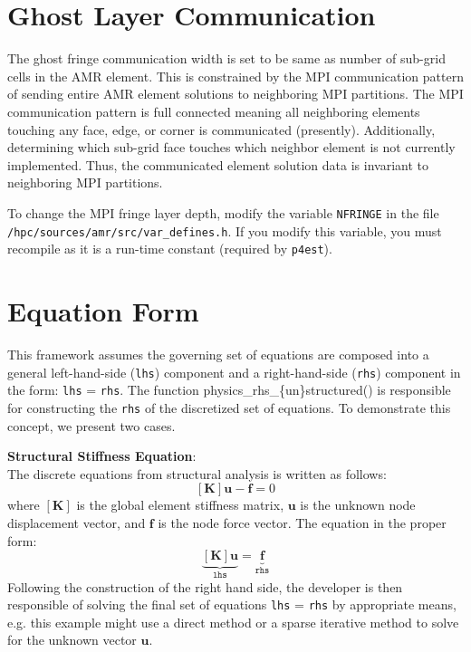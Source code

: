 \documentclass[11pt]{book}
\begin{document}
\section{Ghost Layer Communication}
The ghost fringe communication width is set to be same as number of sub-grid cells in the AMR element.
This is constrained by the MPI communication pattern of sending entire AMR element solutions to neighboring MPI partitions.
The MPI communication pattern is full connected meaning all neighboring elements touching any face, edge, or corner is communicated (presently). 
Additionally, determining which sub-grid face touches which neighbor element is not currently implemented. 
Thus, the communicated element solution data is invariant to neighboring MPI partitions. 

To change the MPI fringe layer depth, modify the variable \texttt{NFRINGE} in the file \\ \texttt{/hpc/sources/amr/src/var\_defines.h}.
If you modify this variable, you must recompile as it is a run-time constant (required by \texttt{p4est}).

\section{Equation Form}
This framework assumes the governing set of equations are composed into a general left-hand-side (\texttt{lhs}) 
component and a right-hand-side (\texttt{rhs}) component in the form: \texttt{lhs} = \texttt{rhs}.
The function physics\_rhs\_\{un\}structured() is responsible for constructing the \texttt{rhs} of the discretized 
set of equations. To demonstrate this concept, we present two cases.
\bigskip

\noindent \textbf{Structural Stiffness Equation}: \\
The discrete equations from structural analysis is written as follows:
\begin{equation*}
\left[\mathbf{K} \right] \mathbf{u} - \mathbf{f} = 0
\end{equation*}
where $\left[\mathbf{K} \right]$ is the global element stiffness matrix, 
$\mathbf{u}$ is the unknown node displacement vector, and 
$\mathbf{f}$ is the node force vector. The equation in the proper form:
\begin{equation*}
\underbrace{\left[\mathbf{K} \right] \mathbf{u}}_{\texttt{lhs}} = \underbrace{\mathbf{f}}_{\texttt{rhs}}
\end{equation*}
Following the construction of the right hand side, the developer is then responsible of solving the final set of equations 
\texttt{lhs} = \texttt{rhs} by appropriate means, e.g. this example might use a direct method or a sparse iterative method 
to solve for the unknown vector $\mathbf{u}$.
\bigskip
\end{document}
